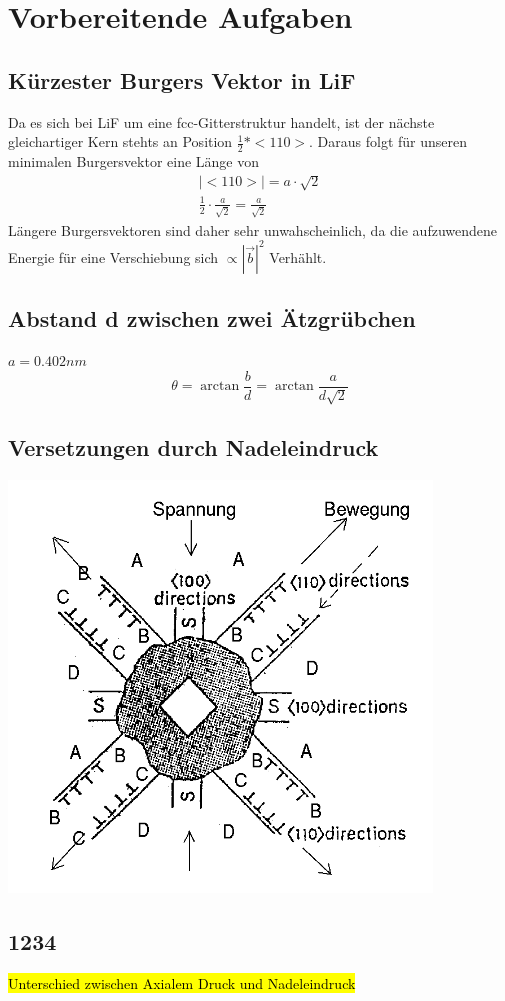 \section{Vorbereitende Aufgaben}
    \subsection{Kürzester Burgers Vektor in LiF}
        Da es sich bei LiF um eine fcc-Gitterstruktur handelt, ist der nächste gleichartiger Kern stehts an Position $\frac{1}{2} * <110>$. Daraus folgt für unseren minimalen
        Burgersvektor eine Länge von
        \begin{align}
            |<110>| = a \cdot \sqrt{2} \\
            \frac{1}{2} \cdot \frac{a}{\sqrt{2}} = \frac{a}{\sqrt{2}}
        \end{align}
        Längere Burgersvektoren sind daher sehr unwahscheinlich, da die aufzuwendene Energie für eine Verschiebung sich $\propto |\vec{b}|^2$ Verhählt.
    \subsection{Abstand d zwischen zwei Ätzgrübchen}
        $a = 0.402nm$
        \begin{equation}
            \theta = \arctan{\frac{b}{d}} = \arctan{\frac{a}{d \sqrt{2}}}
        \end{equation}
    \subsection{Versetzungen durch Nadeleindruck}
        \includegraphics{Images/Question3.PNG}
    \subsection{1234}
        \hl{Unterschied zwischen Axialem Druck und Nadeleindruck}